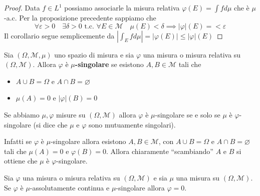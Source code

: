 \begin{proof}
    Data \(f \in L^{1}\) possiamo associarle la misura relativa \(\varphi(E) =
    \int f d\mu\) che è \(\mu\)-a.c. Per la proposizione precedente sappiamo che
    \[
        \forall \varepsilon > 0 \quad \exists \delta > 0 \text{ t.c. } \forall E
        \in \mathcal{M} \quad \mu(E) < \delta \implies |\varphi|(E) = <
        \varepsilon
    \]
    Il corollario segue semplicemente da \( \left| \int_E f d\mu\right| =
    |\varphi(E)| \le |\varphi |(E) \) 
\end{proof}
\begin{definition}
    Sia \((\Omega, \mathcal{M}, \mu)\) uno spazio di misura e sia \(\varphi\)
    una misura o misura relativa su \((\Omega, \mathcal{M})\). Allora
    \(\varphi\) è \textbf{\(\mu\)-singolare} se esistono \(A, B \in
    \mathcal{M}\) tali che 
\begin{itemize}[label = --]
    \item \(A \cup B = \Omega\) e \(A \cap B = \varnothing\) 
    \item \(\mu(A) = 0\) e \(|\varphi |(B) = 0\) 
\end{itemize}
\end{definition}
\begin{remark}
    Se abbiamo \(\mu, \varphi \) misure su \((\Omega, \mathcal{M})\) allora
    \(\varphi \) è \(\mu\)-singolare se e solo se \(\mu\) è
    \(\varphi \)-singolare (si dice che \(\mu\) e \(\varphi\) sono mutuamente singolari).

    Infatti se \(\varphi \) è \(\mu\)-singolare allora esistono \(A, B \in
    \mathcal{M}\), con \(A\cup B =\Omega\) e \(A \cap B = \varnothing\)  tali
    che \(\mu(A) = 0\) e \(\varphi(B) = 0\). Allora chiaramente ``scambiando''
    \(A\) e \(B\) si ottiene che \(\mu\) è \(\varphi\)-singolare.
\end{remark}
\begin{proposition}
    Sia \(\varphi \) una misura o misura relativa su \((\Omega, \mathcal{M})\)
    e sia \(\mu\) una misura su \((\Omega, \mathcal{M})\). Se \(\varphi \) è
    \(\mu\)-assolutamente continua e \(\mu\)-singolare allora \(\varphi = 0\).
\end{proposition}
